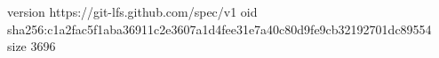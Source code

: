 version https://git-lfs.github.com/spec/v1
oid sha256:c1a2fac5f1aba36911c2e3607a1d4fee31e7a40c80d9fe9cb32192701dc89554
size 3696
